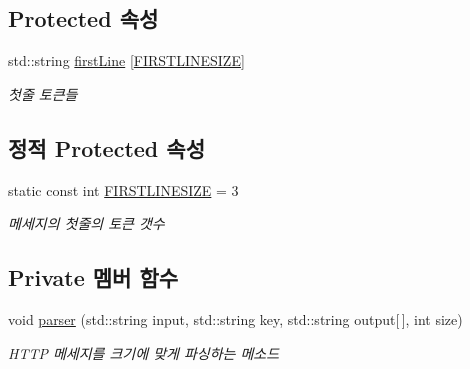 \subsection*{Protected 속성}
\begin{DoxyCompactItemize}
\item 
\mbox{\label{classhttp_1_1_message_a56420a38395db02e6bc33bf27a6c7769}} 
std\+::string \hyperlink{classhttp_1_1_message_a56420a38395db02e6bc33bf27a6c7769}{first\+Line} \mbox{[}\hyperlink{classhttp_1_1_message_a0ff1ef5648a30bcb43d48550f06eb976}{F\+I\+R\+S\+T\+L\+I\+N\+E\+S\+I\+ZE}\mbox{]}
\begin{DoxyCompactList}\small\item\em 첫줄 토큰들 \end{DoxyCompactList}\end{DoxyCompactItemize}
\subsection*{정적 Protected 속성}
\begin{DoxyCompactItemize}
\item 
\mbox{\label{classhttp_1_1_message_a0ff1ef5648a30bcb43d48550f06eb976}} 
static const int \hyperlink{classhttp_1_1_message_a0ff1ef5648a30bcb43d48550f06eb976}{F\+I\+R\+S\+T\+L\+I\+N\+E\+S\+I\+ZE} = 3
\begin{DoxyCompactList}\small\item\em 메세지의 첫줄의 토큰 갯수 \end{DoxyCompactList}\end{DoxyCompactItemize}
\subsection*{Private 멤버 함수}
\begin{DoxyCompactItemize}
\item 
void \hyperlink{classhttp_1_1_message_aa7346502a360e77b2da5cc9a35821a32}{parser} (std\+::string input, std\+::string key, std\+::string output\mbox{[}$\,$\mbox{]}, int size)
\begin{DoxyCompactList}\small\item\em H\+T\+TP 메세지를 크기에 맞게 파싱하는 메소드 \end{DoxyCompactList}\end{DoxyCompactItemize}

